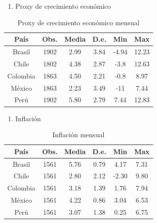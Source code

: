 \documentclass[
  9.5pt,
]{article}
\providecommand{\tightlist}{%
  \setlength{\itemsep}{0pt}\setlength{\parskip}{0pt}}
\begin{document}
\begin{enumerate}
\def\labelenumi{\roman{enumi}.}
\setcounter{enumi}{1}
\tightlist
\item
  Proxy de crecimiento económico
\end{enumerate}

\begin{table}[H]
  \begin{center}
    \begin{tabular}{| c | c | c | c | c | c |}
      \hline
País    & Obs.  & Media & D.e.  & Min   & Max \\ \hline
Brasil  & 1902  & 2.99 &    3.84 &  -4.94   & 12.23 \\
Chile   & 1802  & 4.38 &    2.87    & -3.8  & 12.63 \\
Colombia    & 1863  & 4.50 & 2.21 & -0.8 &  8.97 \\
México  & 1863  & 2.23  & 3.49  & -11   & 7.44 \\
Perú    & 1902  & 5.80 &    2.79 &  7.44 & 12.83 \\ \hline
    \end{tabular}
    \caption{Proxy de crecimiento económico mensual }
  \end{center}
\end{table}

\begin{enumerate}
\def\labelenumi{\roman{enumi}.}
\setcounter{enumi}{2}
\tightlist
\item
  Inflación
\end{enumerate}

\begin{table}[H]
  \begin{center}
    \begin{tabular}{| c | c | c | c | c | c |}
      \hline
País    & Obs.  & Media & D.e.  & Min   & Max \\ \hline
Brasil  & 1561  & 5.76 &    0.79 &  4.17    & 7.31 \\
Chile   & 1561  & 2.80 &    2.12    & -2.30 & 9.80 \\
Colombia    & 1561  & 3.18 & 1.39 & 1.76 &  7.94 \\
México  & 1561  & 4.22  & 0.86  & 3.04  & 6.53 \\
Perú    & 1561  & 3.07 &    1.38 &  0.25 & 6.75 \\ \hline
    \end{tabular}
    \caption{Inflación mensual }
  \end{center}
\end{table}
\end{document}
